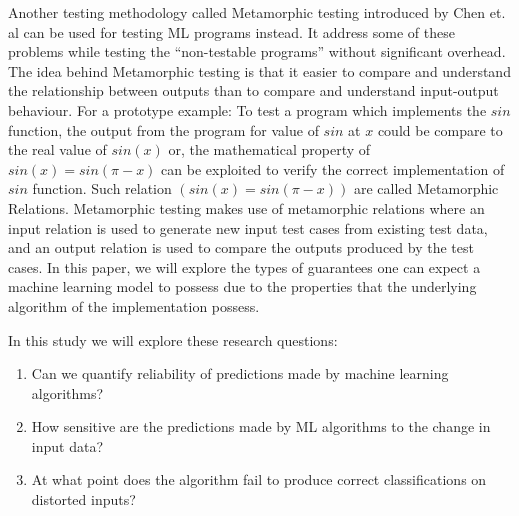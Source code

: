 Another testing methodology called Metamorphic testing introduced by Chen et. al can be used for testing ML programs instead. It address some of these problems while testing the \enquote{non-testable programs} without significant overhead. The idea behind Metamorphic testing is that it easier to compare and understand the relationship between outputs than to compare and understand input-output behaviour. For a prototype example: To test a program which implements the $sin$ function, the output from the program for value of $sin$ at $x$ could be compare to the real value of $sin(x)$ or, the mathematical property of $sin(x) = sin(\pi-x)$ can be exploited to verify the correct implementation of $sin$ function. Such relation $(sin(x) = sin(\pi-x))$ are called Metamorphic Relations. Metamorphic testing makes use of metamorphic relations where an input relation is used to generate new input test cases from existing test data, and an output relation is used to compare the outputs produced by the test cases.\newline
In this paper, we will explore the types of guarantees one can expect a machine learning model to possess due to the properties that the underlying algorithm of the implementation possess.


In this study we will explore these research questions:
\begin{enumerate}
  \item Can we quantify reliability of predictions made by machine learning algorithms?
  \item How sensitive are the predictions made by ML algorithms to the change in input data?
  \item At what point does the algorithm fail to produce correct classifications on distorted inputs?
\end{enumerate}
%
